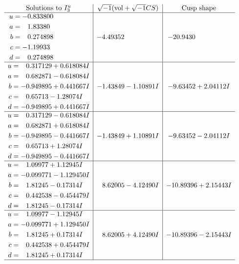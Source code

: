 \documentclass[1p]{elsarticle_modified}
\theoremstyle{definition}
\newcommand{\I}{\sqrt{-1}}
\begin{document}
$$\begin{array}{c|c|c}  
\text{Solutions to }I^u_{3}& \I (\text{vol} + \sqrt{-1}CS) & \text{Cusp shape}\\
 \hline 
\begin{aligned}
u &= -0.833800\phantom{ +0.000000I} \\
a &= \phantom{-}1.83380\phantom{ +0.000000I} \\
b &= \phantom{-}0.274898\phantom{ +0.000000I} \\
c &= -1.19933\phantom{ +0.000000I} \\
d &= \phantom{-}0.274898\phantom{ +0.000000I}\end{aligned}
 & -4.49352\phantom{ +0.000000I} & -20.9430\phantom{ +0.000000I} \\ \hline\begin{aligned}
u &= \phantom{-}0.317129 + 0.618084 I \\
a &= \phantom{-}0.682871 - 0.618084 I \\
b &= -0.949895 + 0.441667 I \\
c &= \phantom{-}0.65713 - 1.28074 I \\
d &= -0.949895 + 0.441667 I\end{aligned}
 & -1.43849 - 1.10891 I & -9.63452 + 2.04112 I \\ \hline\begin{aligned}
u &= \phantom{-}0.317129 - 0.618084 I \\
a &= \phantom{-}0.682871 + 0.618084 I \\
b &= -0.949895 - 0.441667 I \\
c &= \phantom{-}0.65713 + 1.28074 I \\
d &= -0.949895 - 0.441667 I\end{aligned}
 & -1.43849 + 1.10891 I & -9.63452 - 2.04112 I \\ \hline\begin{aligned}
u &= \phantom{-}1.09977 + 1.12945 I \\
a &= -0.099771 - 1.129450 I \\
b &= \phantom{-}1.81245 - 0.17314 I \\
c &= \phantom{-}0.442538 - 0.454479 I \\
d &= \phantom{-}1.81245 - 0.17314 I\end{aligned}
 & \phantom{-}8.62005 - 4.12490 I & -10.89396 + 2.15443 I \\ \hline\begin{aligned}
u &= \phantom{-}1.09977 - 1.12945 I \\
a &= -0.099771 + 1.129450 I \\
b &= \phantom{-}1.81245 + 0.17314 I \\
c &= \phantom{-}0.442538 + 0.454479 I \\
d &= \phantom{-}1.81245 + 0.17314 I\end{aligned}
 & \phantom{-}8.62005 + 4.12490 I & -10.89396 - 2.15443 I\\
 \hline 
 \end{array}$$\newpage\newpage\renewcommand{\arraystretch}{1}
\end{document}
